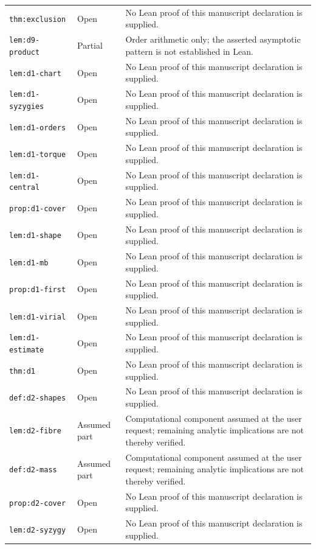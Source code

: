 \documentclass[Threeside,11pt]{article}
\theoremstyle{definition}
\theoremstyle{remark}
\numberwithin{equation}{section}
\theoremstyle{remark}
\newcommand{\code}[1]{\begingroup\def\_{\textunderscore\allowbreak}\texttt{#1}\endgroup}
\begin{document}
\begin{longtable}{p{4.0cm}p{1.8cm}p{8.9cm}}
\code{thm:exclusion} & Open & No Lean proof of this manuscript declaration is supplied. \\
\code{lem:d9-product} & Partial & Order arithmetic only; the asserted asymptotic pattern is not established in Lean. \\
\code{lem:d1-chart} & Open & No Lean proof of this manuscript declaration is supplied. \\
\code{lem:d1-syzygies} & Open & No Lean proof of this manuscript declaration is supplied. \\
\code{lem:d1-orders} & Open & No Lean proof of this manuscript declaration is supplied. \\
\code{lem:d1-torque} & Open & No Lean proof of this manuscript declaration is supplied. \\
\code{lem:d1-central} & Open & No Lean proof of this manuscript declaration is supplied. \\
\code{prop:d1-cover} & Open & No Lean proof of this manuscript declaration is supplied. \\
\code{lem:d1-shape} & Open & No Lean proof of this manuscript declaration is supplied. \\
\code{lem:d1-mb} & Open & No Lean proof of this manuscript declaration is supplied. \\
\code{prop:d1-first} & Open & No Lean proof of this manuscript declaration is supplied. \\
\code{lem:d1-virial} & Open & No Lean proof of this manuscript declaration is supplied. \\
\code{lem:d1-estimate} & Open & No Lean proof of this manuscript declaration is supplied. \\
\code{thm:d1} & Open & No Lean proof of this manuscript declaration is supplied. \\
\code{def:d2-shapes} & Open & No Lean proof of this manuscript declaration is supplied. \\
\code{lem:d2-fibre} & Assumed part & Computational component assumed at the user request; remaining analytic implications are not thereby verified. \\
\code{def:d2-mass} & Assumed part & Computational component assumed at the user request; remaining analytic implications are not thereby verified. \\
\code{prop:d2-cover} & Open & No Lean proof of this manuscript declaration is supplied. \\
\code{lem:d2-syzygy} & Open & No Lean proof of this manuscript declaration is supplied. \\

\end{longtable}
\end{document}

